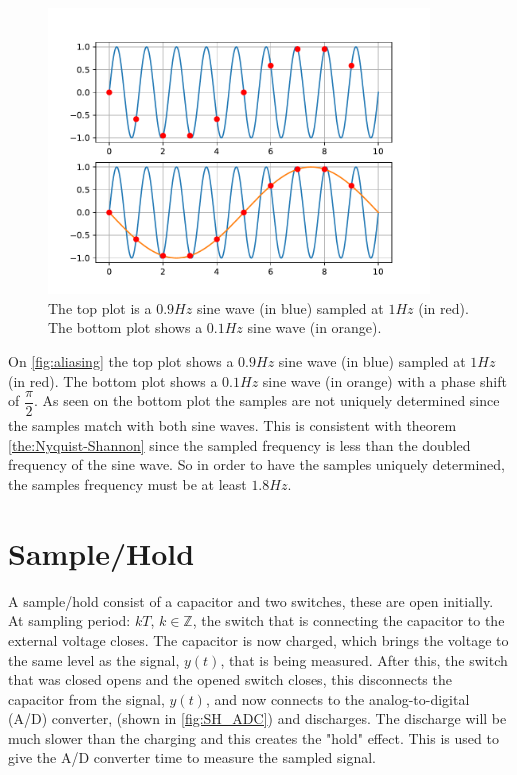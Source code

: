 \begin{figure}[H]
    \centering
    \includegraphics[width=0.9\textwidth]{figures/aliasingFig.pdf}
    \caption{The top plot is a $0.9\si{Hz}$ sine wave (in blue) sampled at $1\si{Hz}$ (in red). The bottom plot shows a $0.1\si{Hz}$ sine wave (in orange).}
    \label{fig:aliasing}
\end{figure}
On \autoref{fig:aliasing} the top plot shows a $0.9\si{Hz}$ sine wave (in blue) sampled at $1\si{Hz}$ (in red). The bottom plot shows a $0.1\si{Hz}$ sine wave (in orange) with a phase shift of $\dfrac{\pi}{2}$. As seen on the bottom plot the samples are not uniquely determined since the samples match with both sine waves. This is consistent with theorem \ref{the:Nyquist-Shannon} since the sampled frequency is less than the doubled frequency of the sine wave. So in order to have the samples uniquely determined, the samples frequency must be at least $1.8\si{Hz}$.  

\section{Sample/Hold}
A sample/hold consist of a capacitor and two switches, these are open initially. At sampling period: $kT$, $k \in \mathbb{Z}$, the switch that is connecting the capacitor to the external voltage closes. The capacitor is now charged, which brings the voltage to the same level as the signal, $y(t)$, that is being measured. After this, the switch that was closed opens and the opened switch closes, this disconnects the capacitor from the signal, $y(t)$, and now connects to the analog-to-digital (A/D) converter, (shown in \autoref{fig:SH_ADC}) and discharges. The discharge will be much slower than the charging and this creates the "hold" effect. This is used to give the A/D converter time to measure the sampled signal.

